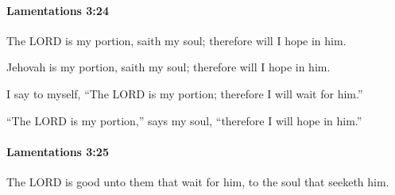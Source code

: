 		\paragraph{Lamentations 3:24} %
			\label{LAMENTATIONS-3-24}

			The LORD is my portion, saith my soul; therefore will I hope in him.

			\begin{versebox}
					\item[BHS] 
					\item[ASV] Jehovah is my portion, saith my soul; therefore will I hope in him.
					\item[NIV] I say to myself, “The LORD is my portion; therefore I will wait for him.”
					\item[NRSV] “The LORD is my portion,” says my soul, “therefore I will hope in him.”
			\end{versebox}

		\paragraph{Lamentations 3:25} %
			\label{LAMENTATIONS-3-25}

			The LORD is good unto them that wait for him, to the soul that seeketh him.

